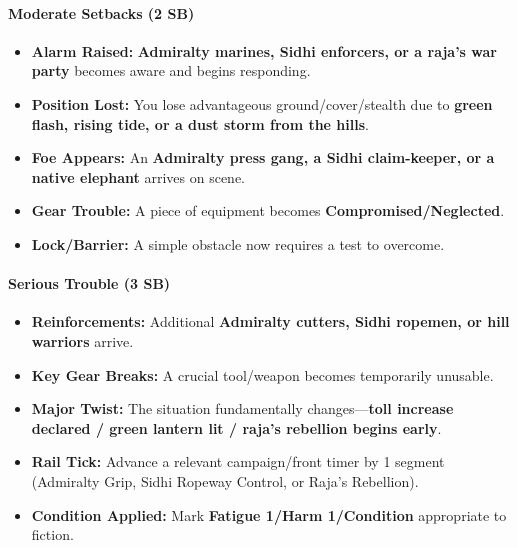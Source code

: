 \paragraph{Moderate Setbacks (2 SB)}
\begin{itemize}
\item \textbf{Alarm Raised:} \textbf{Admiralty marines, Sidhi enforcers, or a raja's war party} becomes aware and begins responding.
\item \textbf{Position Lost:} You lose advantageous ground/cover/stealth due to \textbf{green flash, rising tide, or a dust storm from the hills}.
\item \textbf{Foe Appears:} An \textbf{Admiralty press gang, a Sidhi claim-keeper, or a native elephant} arrives on scene.
\item \textbf{Gear Trouble:} A piece of equipment becomes \textbf{Compromised/Neglected}.
\item \textbf{Lock/Barrier:} A simple obstacle now requires a test to overcome.
\end{itemize}

\paragraph{Serious Trouble (3 SB)}
\begin{itemize}
\item \textbf{Reinforcements:} Additional \textbf{Admiralty cutters, Sidhi ropemen, or hill warriors} arrive.
\item \textbf{Key Gear Breaks:} A crucial tool/weapon becomes temporarily unusable.
\item \textbf{Major Twist:} The situation fundamentally changes---\textbf{toll increase declared / green lantern lit / raja's rebellion begins early}.
\item \textbf{Rail Tick:} Advance a relevant campaign/front timer by 1 segment (Admiralty Grip, Sidhi Ropeway Control, or Raja's Rebellion).
\item \textbf{Condition Applied:} Mark \textbf{Fatigue 1/Harm 1/Condition} appropriate to fiction.
\end{itemize}

